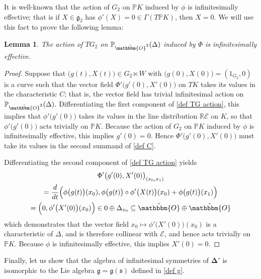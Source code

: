 \documentclass[11pt,letterpaper]{amsart}
\newtheorem{lemma}[theorem]{Lemma}
\numberwithin{equation}{section}
\newcommand{\oct}{\hat{\mathbbm{O}}}
\begin{document}
    It is well-known that the action of ${G}_2$ on $\mathbb{P}K$ induced by $\phi$ is infinitesimally effective; that is if $X\in {\mathfrak{g}}_2$ has $\phi'(X)=0\in \Gamma(T\mathbb PK)$, then $X=0$. We will use this fact to prove the following lemma:
    \begin{lemma}
        \label{lemma: TG2 inf eff}
        The action of $TG_2$ on $\mathbb{P}_{\oct^2}(\Delta)$ induced by $\Phi$ is infinitesimally effective.
    \end{lemma}
    \begin{proof}
        Suppose that $\big(g(t),X(t)\big)\in G_2\ltimes W$ with $\big(g(0),X(0)\big) = (1_{G_2},0)$ is a curve such that the vector field $\Phi'\big(g'(0),X'(0)\big)$ on $TK$ takes its values in the characteristic $C$; that is, the vector field has trivial infinitesimal action on $\mathbb P_{\oct^2}(\Delta)$. Differentiating the first component of \eqref{def TG action}, this implies that $\phi'\big(g'(0)\big)$ takes its values in the line distribution $\mathbb{R}\mathcal E$ on $K$, so that $\phi'\big(g'(0)\big)$ acts trivially on $\mathbb{P}K$. Because the action of $G_2$ on $\mathbb{P}K$ induced by $\phi$ is infinitesimally effective, this implies $g'(0)=0$. Hence $\Phi'\big(g'(0),X'(0)\big)$ must take its values in the second summand of \eqref{def C}.
        
        Differentiating the second component of \eqref{def TG action} yields
        \begin{gather}
            \Phi'\big(g'(0),X'(0)\big)_{(x_0,x_1)} 
            \\
            \label{inf eff 1}
            = \frac{d}{dt}\Big(\phi\big(g(t)\big)(x_0), \phi\big(g(t)\big)\circ \phi'\big(X(t)\big)(x_0) + \phi\big(g(t)\big)(x_1)\Big)
            \\
            = \Big(0,\phi'\big(X'(0)\big)(x_0)\Big) \in 0\oplus\Delta_{x_0}\subseteq  \oct\oplus\oct
        \end{gather}
        which demonstrates that the vector field $x_0\mapsto \phi'\big(X'(0)\big)(x_0)$ is a characteristic of $\Delta$, and is therefore collinear with $\mathcal E$, and hence acts trivially on $\mathbb PK$. Because $\phi$ is infinitesimally effective, this implies $X'(0)=0$. 
    \end{proof}

    Finally, let us show that the algebra of infinitesimal symmetries of $\boldsymbol{\Delta}'$ is isomorphic to the Lie algebra $\mathfrak{g}=\mathfrak{g}(\mathfrak s)$ defined in \eqref{def g}.
\end{document}
